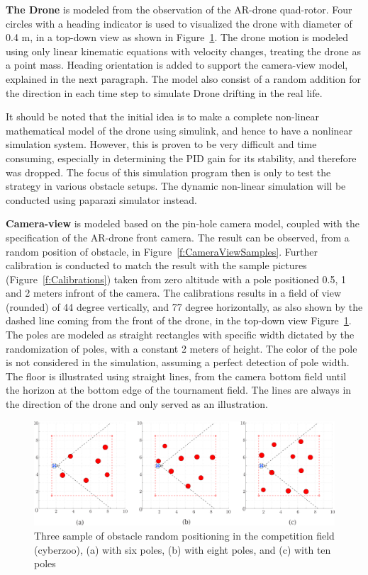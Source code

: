 \textbf{The Drone} is modeled from the observation of the AR-drone quad-rotor. Four circles with a heading indicator is used to visualized the drone with diameter of 0.4 m, in a top-down view as shown in Figure~\ref{f:TopViewSamples}. The drone motion is modeled using only linear kinematic equations with velocity changes, treating the drone as a point mass. Heading orientation is added to support the camera-view model, explained in the next paragraph. The model also consist of a random addition for the direction in each time step to simulate Drone drifting in the real life. 

It should be noted that the initial idea is to make a complete non-linear mathematical model of the drone using simulink, and hence to have a nonlinear simulation system. However, this is proven to be very difficult and time consuming, especially in determining the PID gain for its stability, and therefore was dropped. The focus of this simulation program then is only to test the strategy in various obstacle setups. The dynamic non-linear simulation will be conducted using paparazi simulator instead. 

\textbf{Camera-view} is modeled based on the pin-hole camera model, coupled with the specification of the AR-drone front camera. The result can be observed, from a random position of obstacle, in Figure~\ref{f:CameraViewSamples}. Further calibration is conducted to match the result with the sample pictures (Figure~\ref{f:Calibrations}) taken from zero altitude with a pole positioned 0.5, 1 and 2 meters infront of the camera. The calibrations results in a field of view (rounded) of 44 degree vertically, and 77 degree horizontally, as also shown by the dashed line coming from the front of the drone, in the top-down view Figure~\ref{f:TopViewSamples}. The poles are modeled as straight rectangles with specific width dictated by the randomization of poles, with a constant 2 meters of height. The color of the pole is not considered in the simulation, assuming a perfect detection of pole width. The floor is illustrated using straight lines, from the camera bottom field until the horizon at the bottom edge of the tournament field. The lines are always in the direction of the drone and only served as an illustration.

\begin{figure}[h]
\includegraphics[width=1\linewidth]{Figures/TopViewSamples_3.png}
\centering
\caption{Three sample of obstacle random positioning in the competition field (cyberzoo), (a) with six poles, (b) with eight poles, and (c) with ten poles}
\label{f:TopViewSamples}
\end{figure} 

